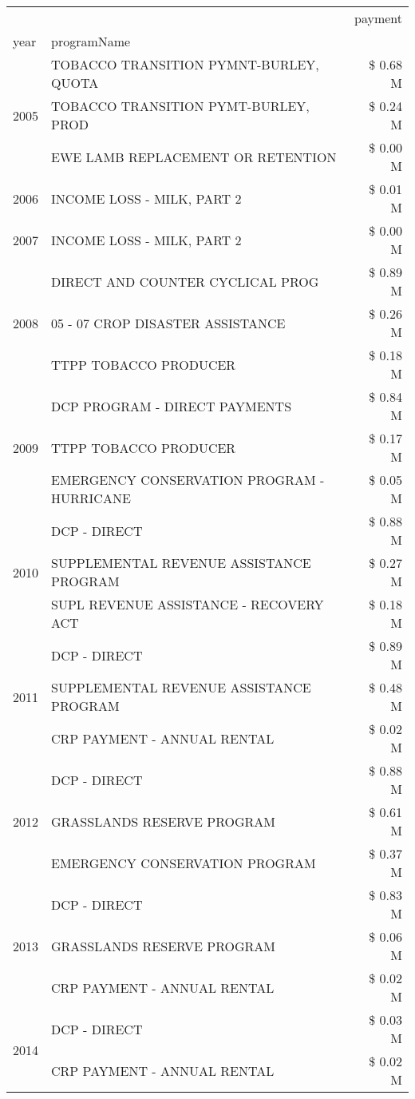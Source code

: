 \begin{tabular}{llr}
\toprule
 &  & payment \\
year & programName &  \\
\midrule
\multirow[t]{3}{*}{2005} & TOBACCO TRANSITION PYMNT-BURLEY, QUOTA & \$ 0.68 M \\
 & TOBACCO TRANSITION PYMT-BURLEY, PROD & \$ 0.24 M \\
 & EWE LAMB REPLACEMENT OR RETENTION & \$ 0.00 M \\
\cline{1-3}
2006 & INCOME LOSS - MILK, PART 2 & \$ 0.01 M \\
\cline{1-3}
2007 & INCOME LOSS - MILK, PART 2 & \$ 0.00 M \\
\cline{1-3}
\multirow[t]{3}{*}{2008} & DIRECT AND COUNTER CYCLICAL PROG & \$ 0.89 M \\
 & 05 - 07 CROP DISASTER ASSISTANCE & \$ 0.26 M \\
 & TTPP TOBACCO PRODUCER & \$ 0.18 M \\
\cline{1-3}
\multirow[t]{3}{*}{2009} & DCP PROGRAM - DIRECT PAYMENTS & \$ 0.84 M \\
 & TTPP TOBACCO PRODUCER & \$ 0.17 M \\
 & EMERGENCY CONSERVATION PROGRAM - HURRICANE & \$ 0.05 M \\
\cline{1-3}
\multirow[t]{3}{*}{2010} & DCP - DIRECT & \$ 0.88 M \\
 & SUPPLEMENTAL REVENUE ASSISTANCE PROGRAM & \$ 0.27 M \\
 & SUPL REVENUE ASSISTANCE - RECOVERY ACT & \$ 0.18 M \\
\cline{1-3}
\multirow[t]{3}{*}{2011} & DCP - DIRECT & \$ 0.89 M \\
 & SUPPLEMENTAL REVENUE ASSISTANCE PROGRAM & \$ 0.48 M \\
 & CRP PAYMENT - ANNUAL RENTAL & \$ 0.02 M \\
\cline{1-3}
\multirow[t]{3}{*}{2012} & DCP - DIRECT & \$ 0.88 M \\
 & GRASSLANDS RESERVE PROGRAM & \$ 0.61 M \\
 & EMERGENCY CONSERVATION PROGRAM & \$ 0.37 M \\
\cline{1-3}
\multirow[t]{3}{*}{2013} & DCP - DIRECT & \$ 0.83 M \\
 & GRASSLANDS RESERVE PROGRAM & \$ 0.06 M \\
 & CRP PAYMENT - ANNUAL RENTAL & \$ 0.02 M \\
\cline{1-3}
\multirow[t]{3}{*}{2014} & DCP - DIRECT & \$ 0.03 M \\
 & CRP PAYMENT - ANNUAL RENTAL & \$ 0.02 M \\

\end{tabular}
